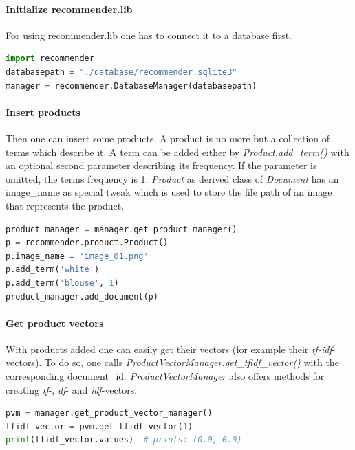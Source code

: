 \paragraph{Initialize recommender.lib}
For using recommender.lib one has to connect it to a database first.
\begin{lstlisting}[language=Python,caption={Startup of recommender.lib},label={lst:recommenderlib-startup}]
import recommender
databasepath = "./database/recommender.sqlite3"
manager = recommender.DatabaseManager(databasepath)
\end{lstlisting}

\paragraph{Insert products}
Then one can insert some products.
A product is no more but a collection of terms which describe it.
A term can be added either by \textit{Product.add\_term()} with an optional second parameter describing its frequency.
If the parameter is omitted, the terms frequency is 1.
\textit{Product} as derived class of \textit{Document} has an image\_name as special tweak which is used to store the file path of an image that represents the product.
\begin{lstlisting}[language=Python,caption={Insertion of products},label={lst:recommenderlib-product-insertion}]
product_manager = manager.get_product_manager()
p = recommender.product.Product()
p.image_name = 'image_01.png'
p.add_term('white')
p.add_term('blouse', 1)
product_manager.add_document(p)
\end{lstlisting}

\paragraph{Get product vectors}
With products added one can easily get their vectors (for example their \textit{tf-idf}-vectors).
To do so, one calls \textit{ProductVectorManager.get\_tfidf\_vector()} with the corresponding document\_id.
\textit{ProductVectorManager} also offers methods for creating \textit{tf}-, \textit{df}- and \textit{idf}-vectors.
\begin{lstlisting}[language=Python,caption={\textit{tf-idf} vector of a product},label={lst:recommenderlib-product-vector}]
pvm = manager.get_product_vector_manager()
tfidf_vector = pvm.get_tfidf_vector(1)
print(tfidf_vector.values)  # prints: (0.0, 0.0)
\end{lstlisting}

